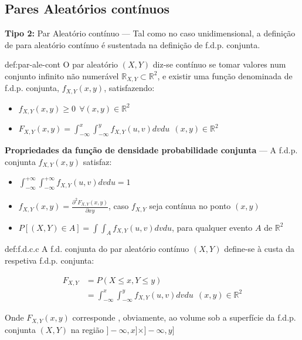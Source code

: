 \clearpage
\subsection[3.2 Pares Aleatórios contínuos]{\hspace*{0.075 em}\raisebox{0.2 em}{$\pmb{\drsh}$} Pares Aleatórios contínuos}

\noindent\textbf{Tipo 2:} Par Aleatório contínuo --- Tal como no caso unidimensional, a definição de para aleatório contínuo é sustentada na definição de f.d.p. conjunta.


\begin{theo}{def:par-ale-cont}\label{def:par-ale-cont}
    \noindent O par aleatório $(X,Y)$ diz-se contínuo se tomar valores num conjunto infinito não numerável $\mathbb{R}_{X,Y} \subset \mathbb{R}^2$, e existir uma função denominada de f.d.p. conjunta, $f_{X,Y}(x,y)$, satisfazendo:

    \begin{itemize}
        \item $f_{X,Y}(x,y) \ge 0\,\; \forall (x,y) \in \mathbb{R}^2$
        \item $F_{X,Y}(x,y) = \int_{-\infty}^{x} \int_{-\infty}^{y} f_{X,Y}(u,v)dvdu\,\; (x,y) \in \mathbb{R}^2$
    \end{itemize}
\end{theo}

\noindent \textbf{Propriedades da função de densidade probabilidade conjunta} --- A f.d.p. conjunta $f_{X,Y}(x,y)$ satisfaz:
\begin{itemize}
    \item $\int_{-\infty}^{+\infty} \int_{-\infty}^{+\infty} f_{X,Y}(u,v)dvdu = 1$
    \item $f_{X,Y}(x,y) = \frac{\partial^2 F_{X,Y}(x,y)}{\partial xy}$, caso $f_{X,Y}$ seja contínua no ponto $(x,y)$
    \item $P[(X,Y) \in A] = \int \int_{A} f_{X,Y}(u,v)dvdu$, para qualquer evento $A$ de $\mathbb{R}^2$
\end{itemize}

\begin{theo}{def:f.d.c.c}\label{def:f.d.c.c}
    \noindent A f.d. conjunta do par aleatório contínuo $(X,Y)$ define-se à custa da respetiva f.d.p. conjunta:

    \vspace{-1 em}
    \begin{align*}
        F_{X,Y} &= P(X \leq x, Y \leq y)\\
        &= \int_{-\infty}^{x} \int_{-\infty}^{y} f_{X,Y}(u,v)dvdu\,\; (x,y) \in \mathbb{R}^2
    \end{align*}

    \noindent Onde $F_{X,Y}(x,y)$ corresponde , obviamente, ao volume sob a superfície da f.d.p. conjunta $(X,Y)$ na região $]-\infty, x] \times ]-\infty, y]$
\end{theo}

